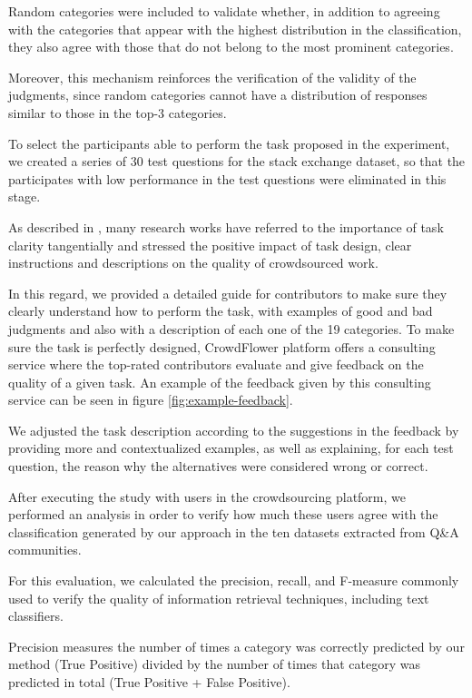 Random categories were included to validate whether, in addition to agreeing with the categories that appear with the highest distribution in the classification, they also agree with those that do not belong to the most prominent categories.  

Moreover, this mechanism reinforces the verification of the validity of the judgments, since random categories cannot have a distribution of responses similar to those in the top-3 categories.

To select the participants able to perform the task proposed in the experiment, we created a series of 30 test questions for the stack exchange dataset, so that the participates with low performance in the test questions were eliminated in this stage.


As described in \cite{Gadiraju:2017}, many research works have referred to the importance of task clarity tangentially and stressed the positive impact of task design, clear instructions and descriptions on the quality of crowdsourced work. 

In this regard, we provided a detailed guide for contributors to make sure they clearly understand how to perform the task, with examples of good and bad judgments and also with a description of each one of the 19 categories. To make sure the task is perfectly designed, CrowdFlower platform offers a consulting service where the top-rated contributors evaluate and give feedback on the quality of a given task. An example of the feedback given by this consulting service can be seen in figure \ref{fig:example-feedback}. 

We adjusted the task description according to the suggestions in the feedback by providing more and contextualized examples, as well as explaining, for each test question, the reason why the alternatives were considered wrong or correct.  

After executing the study with users in the crowdsourcing platform, we performed an analysis in order to verify how much these users agree with the classification generated by our approach in the ten datasets extracted from Q\&A communities.

For this evaluation, we calculated the precision, recall, and F-measure commonly used to verify the quality of information retrieval techniques, including text classifiers\cite{makhoul1999performance}.

Precision measures the number of times a category was correctly predicted by our method (True Positive) divided by the number of times that category was predicted in total (True Positive + False Positive).

